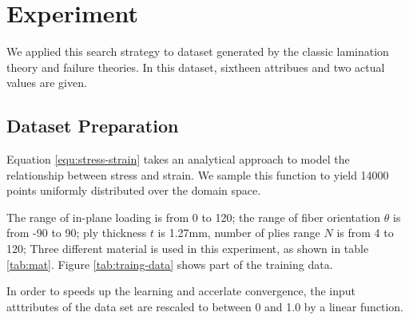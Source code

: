 \section{Experiment}
We applied this search strategy to dataset generated by the classic lamination
theory and failure theories. In this dataset, sixtheen attribues and two actual
values are given.

\subsection{Dataset Preparation}
Equation \ref{equ:stress-strain} takes an analytical approach to model the
relationship between stress and strain. We sample this function to yield 14000 points
uniformly distributed over the domain space.

The range of in-plane loading is from 0 to 120; the range of fiber orientation $\theta$ is from
-90 to 90; ply thickness $t$ is 1.27mm, number of plies range $N$ is from 4 to 120;
Three different material is used in this experiment, as shown in table \ref{tab:mat}.
Figure \ref{tab:traing-data} shows part of the training data.

In order to speeds up the learning and accerlate convergence, the input
atttributes of the data set are rescaled to between 0 and 1.0 by a linear function.








